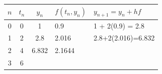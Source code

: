 \documentclass[convert]{standalone}
\begin{document}
\begin{tabular}{|c|c|c|l|l|}
	\hline
	$n$ & $t_n$ & $y_n$ & $f(t_n,y_n)$ & $y_{n+1}=y_n + hf$ \\ \hline
	0   & 0     & 1     & 0.9          & 1 + 2(0.9) = 2.8   \\ \hline
	1   & 2     & 2.8   & 2.016        & 2.8+2(2.016)=6.832 \\ \hline
	2   & 4     & 6.832 & 2.1644       &                    \\ \hline
	3   & 6     &       &              &                    \\ \hline
\end{tabular}
\end{document}
